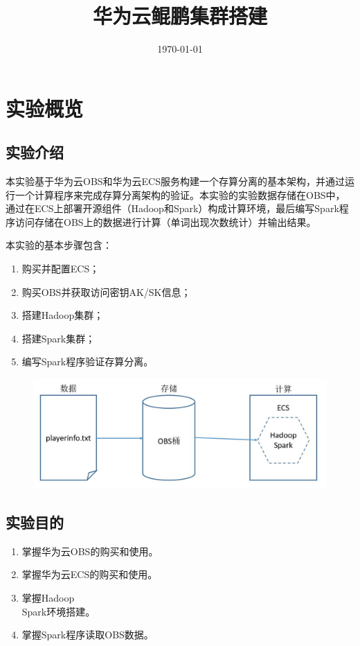 \documentclass{../source/zjureport}
\title{华为云鲲鹏集群搭建}
\date{\today}
\begin{document}
    \makecover
    \makeheader
    \section{实验概览}

        \subsection{实验介绍}
        本实验基于华为云OBS和华为云ECS服务构建一个存算分离的基本架构，并通过运行一个计算程序来完成存算分离架构的验证。本实验的实验数据存储在OBS中，通过在ECS上部署开源组件（Hadoop和Spark）构成计算环境，最后编写Spark程序访问存储在OBS上的数据进行计算（单词出现次数统计）并输出结果。

        本实验的基本步骤包含：
        \begin{enumerate}
            \item 购买并配置ECS；
            \item 购买OBS并获取访问密钥AK/SK信息；
            \item 搭建Hadoop集群；
            \item 搭建Spark集群；
            \item 编写Spark程序验证存算分离。
        \end{enumerate}
        \begin{figure}[H]
            \centering
            \includegraphics[]{figure/框图.jpg}
        \end{figure}

        \subsection{实验目的}
            \begin{enumerate}
                \item 掌握华为云OBS的购买和使用。
                \item 掌握华为云ECS的购买和使用。
                \item 掌握Hadoop\\Spark环境搭建。
                \item 掌握Spark程序读取OBS数据。
            \end{enumerate}
\end{document}
